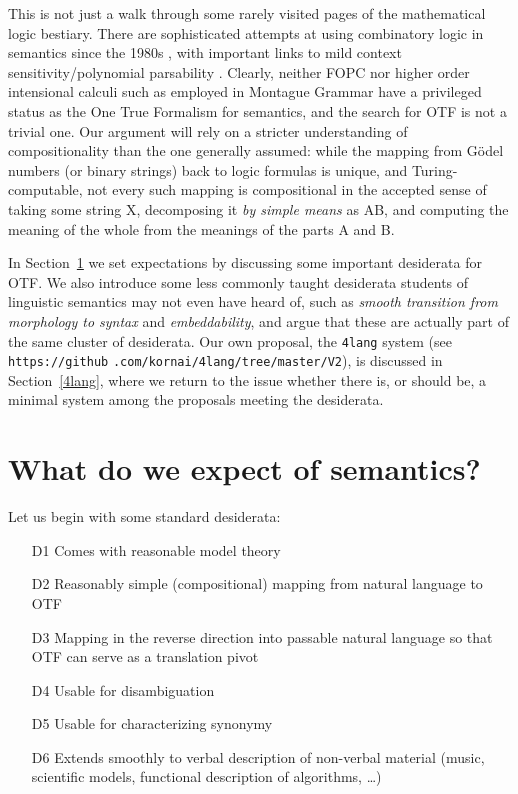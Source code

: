 \documentclass[output=paper,colorlinks=true,citecolor=brown]{langscibook}
\begin{document}
This is not just a walk through some rarely visited pages of the mathematical
logic bestiary. There are sophisticated attempts at using combinatory logic in
semantics since the 1980s
\citep{Szabolcsi:1987,Steedman:1987,Jacobson:1999,Baldridge:2002}, with
important links to mild context sensitivity/polynomial parsability
\citep{Joshi:1990}. Clearly, neither FOPC nor higher order intensional calculi
such as employed in Montague Grammar have a privileged status as the One True
Formalism for semantics, and the search for OTF is not a trivial one. Our
argument will rely on a stricter understanding of compositionality than the
one generally assumed: while the mapping from G\"odel numbers (or binary
strings) back to logic formulas is unique, and Turing-computable, not every
such mapping is compositional in the accepted sense of taking some string X,
decomposing it {\it by simple means} as AB, and computing the meaning of
the whole from the meanings of the parts A and B. 

In Section~\ref{expect} we set expectations by discussing some important
desiderata for OTF.  We also introduce some less commonly taught desiderata
students of linguistic semantics may not even have heard of, such as {\it
  smooth transition from morphology to syntax} and {\it embeddability}, and
argue that these are actually part of the same cluster of desiderata.  Our own
proposal, the \texttt{4lang} system (see \texttt{https://github}
\texttt{.com/kornai/4lang/tree/master/V2}), is discussed in
Section~\ref{4lang}, where we return to the issue whether there is, or should
be, a minimal system among the proposals meeting the desiderata.

\section{What do we expect of semantics?}\label{expect}

Let us begin with some standard desiderata: 

\begin{enumerate}
\item[D1] Comes with reasonable model theory
\item[D2] Reasonably simple (compositional) mapping from natural language to
  OTF
\item[D3] Mapping in the reverse direction into passable natural language so that
  OTF can serve as a translation pivot
\item[D4] Usable for disambiguation
\item[D5] Usable for characterizing synonymy
\item[D6] Extends smoothly to verbal description of non-verbal material (music,
  scientific models, functional description of algorithms, \ldots)
\end{enumerate}
\end{document}
